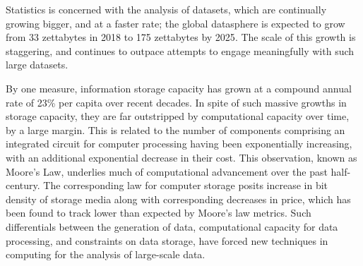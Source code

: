 Statistics is concerned with the analysis of datasets, which are continually growing bigger, and at a faster rate;
the global datasphere is expected to grow from 33 zettabytes in 2018 to 175 zettabytes by 2025\cite{rydning2018digitization}.
The scale of this growth is staggering, and continues to outpace attempts to engage meaningfully with such large datasets.

By one measure, information storage capacity has grown at a compound annual rate of 23\% per capita over recent decades\cite{hilbert2011world}.
In spite of such massive growths in storage capacity, they are far outstripped by computational capacity over time, by a large margin\cite{fontana2018moore}.
This is related to the number of components comprising an integrated circuit for computer processing having been exponentially increasing, with an additional exponential decrease in their cost\cite{moore1975progress}.
This observation, known as Moore's Law, underlies much of computational advancement over the past half-century.
The corresponding law for computer storage posits increase in bit density of storage media along with corresponding decreases in price, which has been found to track lower than expected by Moore's law metrics.
Such differentials between the generation of data, computational capacity for data processing, and constraints on data storage, have forced new techniques in computing for the analysis of large-scale data.\\


